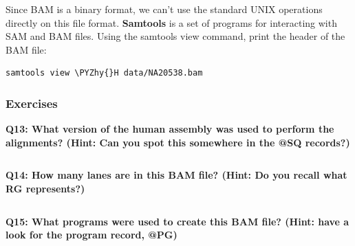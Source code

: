 \documentclass[11pt]{article}
\makeatletter
\def\PYZhy{\char`\-}
\newcommand{\boxspacing}{\kern\kvtcb@left@rule\kern\kvtcb@boxsep}
\newcommand{\prompt}[4]{
        {\ttfamily\llap{{\color{#2}[#3]:\hspace{3pt}#4}}\vspace{-\baselineskip}}
    }
\makeatother
\begin{document}
    Since BAM is a binary format, we can't use the standard UNIX operations
directly on this file format. \textbf{Samtools} is a set of programs for
interacting with SAM and BAM files. Using the samtools view command,
print the header of the BAM file:

    \begin{tcolorbox}[breakable, size=fbox, boxrule=1pt, pad at break*=1mm,colback=cellbackground, colframe=cellborder]
\prompt{In}{incolor}{ }{\boxspacing}
\begin{Verbatim}[commandchars=\\\{\}]
samtools view \PYZhy{}H data/NA20538.bam
\end{Verbatim}
\end{tcolorbox}

    \hypertarget{exercises}{%
\subsubsection{Exercises}\label{exercises}}

    \textbf{Q13: What version of the human assembly was used to perform the
alignments? (Hint: Can you spot this somewhere in the @SQ records?)}

    \begin{tcolorbox}[breakable, size=fbox, boxrule=1pt, pad at break*=1mm,colback=cellbackground, colframe=cellborder]
\prompt{In}{incolor}{ }{\boxspacing}
\begin{Verbatim}[commandchars=\\\{\}]

\end{Verbatim}
\end{tcolorbox}

    \textbf{Q14: How many lanes are in this BAM file? (Hint: Do you recall
what RG represents?)}

    \begin{tcolorbox}[breakable, size=fbox, boxrule=1pt, pad at break*=1mm,colback=cellbackground, colframe=cellborder]
\prompt{In}{incolor}{ }{\boxspacing}
\begin{Verbatim}[commandchars=\\\{\}]

\end{Verbatim}
\end{tcolorbox}

    \textbf{Q15: What programs were used to create this BAM file? (Hint:
have a look for the program record, @PG)}

    \begin{tcolorbox}[breakable, size=fbox, boxrule=1pt, pad at break*=1mm,colback=cellbackground, colframe=cellborder]
\prompt{In}{incolor}{ }{\boxspacing}
\begin{Verbatim}[commandchars=\\\{\}]

\end{Verbatim}
\end{tcolorbox}
\end{document}
